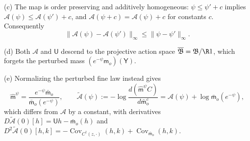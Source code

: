 (c) The map is order preserving and additively homogeneous:
$\psi\le\psi'+c$ implies $\mathcal A(\psi)\le\mathcal A(\psi')+c$, and
$\mathcal A(\psi+c)=\mathcal A(\psi)+c$ for constants $c$. Consequently
\begin{equation}
\lVert\mathcal A(\psi)-\mathcal A(\psi')\rVert_\infty
\le\lVert\psi-\psi'\rVert_\infty .
\label{eq:rg-nonlinear-action-sup-contraction}
\end{equation}

(d) Both $\mathcal A$ and $\mathsf U$ descend to the projective action space
$\overline{\mathfrak B}=\mathfrak B/\R1$, which forgets the perturbed mass
$(e^{-\psi}\mathsf m_o)(\mathsf Y)$.

(e) Normalizing the perturbed fine law instead gives
\begin{equation}
\widehat{\mathsf m}^\psi
=\frac{e^{-\psi}\bar{\mathsf m}_o}{\bar{\mathsf m}_o(e^{-\psi})},
\qquad
\widetilde{\mathcal A}(\psi)
:=-\log\frac{d(\widehat{\mathsf m}^\psi C)}{d\bar{\mathsf m}_o^c}
=\mathcal A(\psi)+\log\bar{\mathsf m}_o(e^{-\psi}),
\label{eq:rg-normalized-perturbation-action}
\end{equation}
which differs from $\mathcal A$ by a constant, with derivatives
$D\widetilde{\mathcal A}(0)[h]=\mathsf Uh-\bar{\mathsf m}_o(h)$ and
$D^2\widetilde{\mathcal A}(0)[h,k]=-\operatorname{Cov}_{C^\dagger(z,\cdot)}(h,k)
+\operatorname{Cov}_{\bar{\mathsf m}_o}(h,k)$. 

